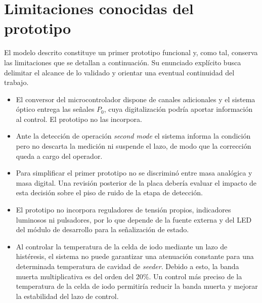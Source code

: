 \section{Limitaciones conocidas del prototipo}
\label{sec:me-limitaciones}

El modelo descrito constituye un primer prototipo funcional y, como tal, conserva las limitaciones que se detallan a continuación. Su enunciado explícito busca delimitar el alcance de lo validado y orientar una eventual continuidad del trabajo.

\begin{itemize}
  \item El conversor del microcontrolador dispone de canales adicionales y el sistema óptico entrega las señales $P_0$, cuya digitalización podría aportar información al control. El prototipo no las incorpora.
  \item Ante la detección de operación \emph{second mode} el sistema informa la condición pero no descarta la medición ni suspende el lazo, de modo que la corrección queda a cargo del operador.
  \item Para simplificar el primer prototipo no se discriminó entre masa analógica y masa digital. Una revisión posterior de la placa debería evaluar el impacto de esta decisión sobre el piso de ruido de la etapa de detección.
  \item El prototipo no incorpora reguladores de tensión propios, indicadores luminosos ni pulsadores, por lo que depende de la fuente externa y del LED del módulo de desarrollo para la señalización de estado.
  \item Al controlar la temperatura de la celda de iodo mediante un lazo de histéresis, el sistema no puede garantizar una atenuación constante para una determinada temperatura de cavidad de \emph{seeder}. Debido a esto, la banda muerta multiplicativa es del orden del 20\%. Un control más preciso de la temperatura de la celda de iodo permitiría reducir la banda muerta y mejorar la estabilidad del lazo de control.

\end{itemize}